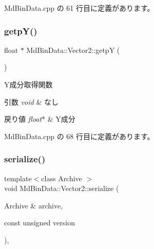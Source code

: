  Md\+Bin\+Data.\+cpp の 61 行目に定義があります。

\mbox{\label{class_md_bin_data_1_1_vector2_a12d825bc212f5b598d5e9b29860999a1}} 
\subsubsection{\texorpdfstring{getp\+Y()}{getpY()}}
{\footnotesize\ttfamily float $\ast$ Md\+Bin\+Data\+::\+Vector2\+::getpY (\begin{DoxyParamCaption}{ }\end{DoxyParamCaption})}



Y成分取得関数 


\begin{DoxyParams}{引数}
{\em void} & なし \\
\hline
\end{DoxyParams}

\begin{DoxyRetVals}{戻り値}
{\em float$\ast$} & Y成分 \\
\hline
\end{DoxyRetVals}


 Md\+Bin\+Data.\+cpp の 68 行目に定義があります。

\mbox{\label{class_md_bin_data_1_1_vector2_a12fa2dd687f2d32fb889df7bcc5cf126}} 
\subsubsection{\texorpdfstring{serialize()}{serialize()}}
{\footnotesize\ttfamily template$<$class Archive $>$ \\
void Md\+Bin\+Data\+::\+Vector2\+::serialize (\begin{DoxyParamCaption}\item[{Archive \&}]{archive,  }\item[{const unsigned}]{version }\end{DoxyParamCaption})\hspace{0.3cm}{\ttfamily [inline]}, {\ttfamily [private]}}



